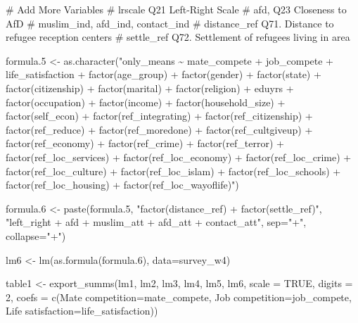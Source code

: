 \documentclass[
]{article}
\newenvironment{Shaded}{\begin{snugshade}}{\end{snugshade}}
\newcommand{\AttributeTok}[1]{\textcolor[rgb]{0.40,0.45,0.13}{#1}}
\newcommand{\CommentTok}[1]{\textcolor[rgb]{0.37,0.37,0.37}{#1}}
\newcommand{\ConstantTok}[1]{\textcolor[rgb]{0.56,0.35,0.01}{#1}}
\newcommand{\DecValTok}[1]{\textcolor[rgb]{0.68,0.00,0.00}{#1}}
\newcommand{\FloatTok}[1]{\textcolor[rgb]{0.68,0.00,0.00}{#1}}
\newcommand{\FunctionTok}[1]{\textcolor[rgb]{0.28,0.35,0.67}{#1}}
\newcommand{\NormalTok}[1]{\textcolor[rgb]{0.00,0.23,0.31}{#1}}
\newcommand{\OtherTok}[1]{\textcolor[rgb]{0.00,0.23,0.31}{#1}}
\newcommand{\StringTok}[1]{\textcolor[rgb]{0.13,0.47,0.30}{#1}}
\begin{document}
\begin{Shaded}
\begin{Highlighting}[]
\CommentTok{\# Add More Variables }
\CommentTok{\# lrscale  Q21  Left{-}Right Scale}
\CommentTok{\# afd, Q23  Closeness to AfD}
\CommentTok{\# muslim\_ind, afd\_ind, contact\_ind}
\CommentTok{\# distance\_ref Q71. Distance to refugee reception centers}
\CommentTok{\# settle\_ref Q72. Settlement of refugees living in area}

\NormalTok{formula}\FloatTok{.5} \OtherTok{\textless{}{-}} 
  \FunctionTok{as.character}\NormalTok{(}\StringTok{"only\_means \textasciitilde{} mate\_compete + job\_compete + }
\StringTok{               life\_satisfaction +  factor(age\_group) + factor(gender) + }
\StringTok{               factor(state) + factor(citizenship) + factor(marital) + }
\StringTok{               factor(religion) + eduyrs + factor(occupation) + }
\StringTok{               factor(income) + factor(household\_size) + factor(self\_econ) + }
\StringTok{               factor(ref\_integrating) + factor(ref\_citizenship) + factor(ref\_reduce) + }
\StringTok{               factor(ref\_moredone) + factor(ref\_cultgiveup) + }
\StringTok{               factor(ref\_economy) + factor(ref\_crime) + factor(ref\_terror)  + }
\StringTok{               factor(ref\_loc\_services) +  factor(ref\_loc\_economy) + factor(ref\_loc\_crime) + }
\StringTok{               factor(ref\_loc\_culture) + factor(ref\_loc\_islam) + }
\StringTok{               factor(ref\_loc\_schools) + factor(ref\_loc\_housing) + factor(ref\_loc\_wayoflife)"}\NormalTok{)}

\NormalTok{formula}\FloatTok{.6} \OtherTok{\textless{}{-}} \FunctionTok{paste}\NormalTok{(formula}\FloatTok{.5}\NormalTok{, }\StringTok{"factor(distance\_ref) + factor(settle\_ref)"}\NormalTok{, }
                   \StringTok{"left\_right + afd + muslim\_att + afd\_att + contact\_att"}\NormalTok{, }
                   \AttributeTok{sep=}\StringTok{"+"}\NormalTok{, }\AttributeTok{collapse=}\StringTok{"+"}\NormalTok{) }

\NormalTok{lm6 }\OtherTok{\textless{}{-}} \FunctionTok{lm}\NormalTok{(}\FunctionTok{as.formula}\NormalTok{(formula}\FloatTok{.6}\NormalTok{), }\AttributeTok{data=}\NormalTok{survey\_w4)}

\NormalTok{table1 }\OtherTok{\textless{}{-}} \FunctionTok{export\_summs}\NormalTok{(lm1, lm2, lm3, lm4, lm5, lm6, }\AttributeTok{scale =} \ConstantTok{TRUE}\NormalTok{, }\AttributeTok{digits =} \DecValTok{2}\NormalTok{, }\AttributeTok{coefs =} \FunctionTok{c}\NormalTok{(}\StringTok{\textquotesingle{}Mate competition\textquotesingle{}}\OtherTok{=}\StringTok{\textquotesingle{}mate\_compete\textquotesingle{}}\NormalTok{, }\StringTok{\textquotesingle{}Job competition\textquotesingle{}}\OtherTok{=}\StringTok{\textquotesingle{}job\_compete\textquotesingle{}}\NormalTok{, }\StringTok{\textquotesingle{}Life satisfaction\textquotesingle{}}\OtherTok{=}\StringTok{\textquotesingle{}life\_satisfaction\textquotesingle{}}\NormalTok{)) }
  

\end{Highlighting}
\end{Shaded}
\end{document}
